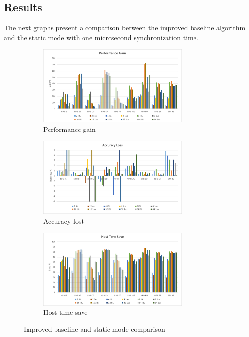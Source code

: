 \subsection{Results}

The next graphs present a comparison between the improved baseline algorithm and the static mode with one microsecond synchronization time. 

\begin{figure}[H]
    \centering
    \begin{subfigure}{\textwidth}
        \centering
        \includegraphics[width=0.82\textwidth]{Images/Performance_FINAL.png}
        \caption{ Performance gain}
        \label{fig:Performance_FINAL}
    \end{subfigure}
    \begin{subfigure}{\textwidth}
        \centering
        \includegraphics[width=0.82\textwidth]{Images/Accuracy_FINAL.png}
        \caption{ Accuracy lost}
        \label{fig:Accuracy_FINAL}
    \end{subfigure}
    \begin{subfigure}{\textwidth}
        \centering
        \includegraphics[width=0.82\textwidth]{Images/Host_FINAL.png}
        \caption{ Host time save}
        \label{fig:Host_FINAL}
    \end{subfigure}

\caption{Improved baseline and static mode comparison}
\label{fig:results_FINAL}
\end{figure}


